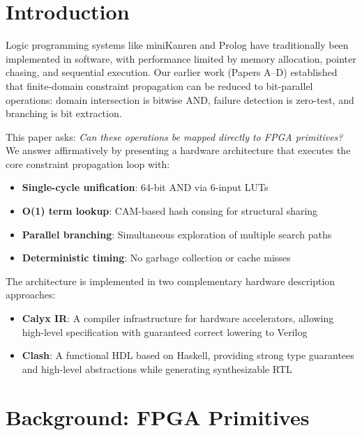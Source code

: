 \documentclass[11pt,a4paper]{article}
\begin{document}
\section{Introduction}
\label{sec:intro_chirho}

\scopeclarification

Logic programming systems like miniKanren and Prolog have traditionally been
implemented in software, with performance limited by memory allocation, pointer
chasing, and sequential execution. Our earlier work (Papers A--D) established
that finite-domain constraint propagation can be reduced to bit-parallel
operations: domain intersection is bitwise AND, failure detection is zero-test,
and branching is bit extraction.

This paper asks: \emph{Can these operations be mapped directly to FPGA
primitives?} We answer affirmatively by presenting a hardware architecture
that executes the core constraint propagation loop with:

\begin{itemize}
  \item \textbf{Single-cycle unification}: 64-bit AND via 6-input LUTs
  \item \textbf{O(1) term lookup}: CAM-based hash consing for structural sharing
  \item \textbf{Parallel branching}: Simultaneous exploration of multiple search paths
  \item \textbf{Deterministic timing}: No garbage collection or cache misses
\end{itemize}

The architecture is implemented in two complementary hardware description
approaches:
\begin{itemize}
  \item \textbf{Calyx IR}: A compiler infrastructure for hardware accelerators,
    allowing high-level specification with guaranteed correct lowering to Verilog
  \item \textbf{Clash}: A functional HDL based on Haskell, providing strong
    type guarantees and high-level abstractions while generating synthesizable RTL
\end{itemize}

\section{Background: FPGA Primitives}
\label{sec:background_chirho}
\end{document}
